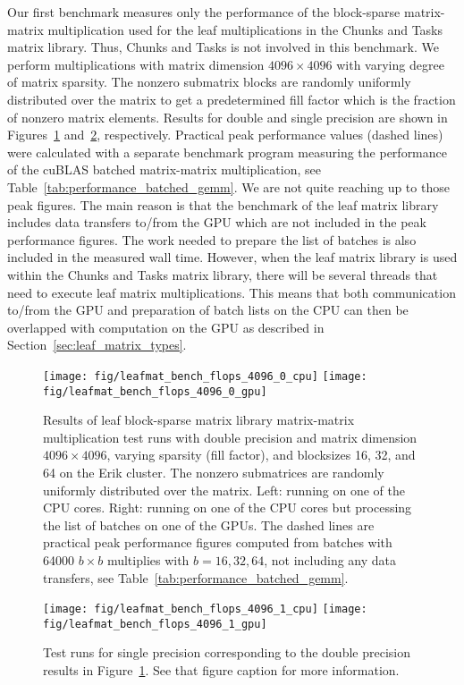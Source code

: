 \documentclass{elsarticle}
\begin{document}
Our first benchmark measures only the performance of the block-sparse
matrix-matrix multiplication used for the leaf multiplications in the
Chunks and Tasks matrix library. Thus, Chunks and Tasks is not
involved in this benchmark. We perform multiplications with matrix
dimension $4096 \times 4096$ with varying degree of matrix
sparsity. The nonzero submatrix blocks are randomly uniformly
distributed over the matrix to get a predetermined fill factor which
is the fraction of nonzero matrix elements. Results for double and
single precision are shown in Figures~\ref{fig:leafmat_bench_double}
and~\ref{fig:leafmat_bench_single}, respectively.  Practical peak
performance values (dashed lines) were calculated with a separate
benchmark program measuring the performance of the cuBLAS batched
matrix-matrix multiplication, see
Table~\ref{tab:performance_batched_gemm}. We are not quite reaching up
to those peak figures. The main reason is that the benchmark of the
leaf matrix library includes data transfers to/from the GPU which are
not included in the peak performance figures. The work needed to
prepare the list of batches is also included in the measured wall
time. However, when the leaf matrix library is used within the Chunks
and Tasks matrix library, there will be several threads that need to
execute leaf matrix multiplications. This means that both
communication to/from the GPU and preparation of batch lists on the
CPU can then be overlapped with computation on the GPU as described in
Section~\ref{sec:leaf_matrix_types}.

\begin{figure}
  \begin{center}
    \texttt{[image: fig/leafmat\_bench\_flops\_4096\_0\_cpu]}
    \texttt{[image: fig/leafmat\_bench\_flops\_4096\_0\_gpu]}
  \end{center}
  \caption{Results of leaf block-sparse matrix library matrix-matrix
    multiplication test runs with double precision and matrix
    dimension $4096 \times 4096$, varying sparsity (fill factor), and
    blocksizes 16, 32, and 64 on the Erik cluster. The nonzero
    submatrices are randomly uniformly distributed over the matrix.
    Left: running on one of the CPU cores. Right: running on one of
    the CPU cores but processing the list of batches on one of the
    GPUs.  The dashed lines are practical peak performance figures
    computed from batches with 64000 $b\times b$ multiplies with $b =
    16,32,64$, not including any data transfers, see
    Table~\ref{tab:performance_batched_gemm}. \label{fig:leafmat_bench_double}}
\end{figure}
\begin{figure}
  \begin{center}
    \texttt{[image: fig/leafmat\_bench\_flops\_4096\_1\_cpu]}
    \texttt{[image: fig/leafmat\_bench\_flops\_4096\_1\_gpu]}
  \end{center}
  \caption{Test runs for single precision corresponding to the double
    precision results in Figure~\ref{fig:leafmat_bench_double}. See
    that figure caption for more information.
 \label{fig:leafmat_bench_single}}
\end{figure}
\end{document}
